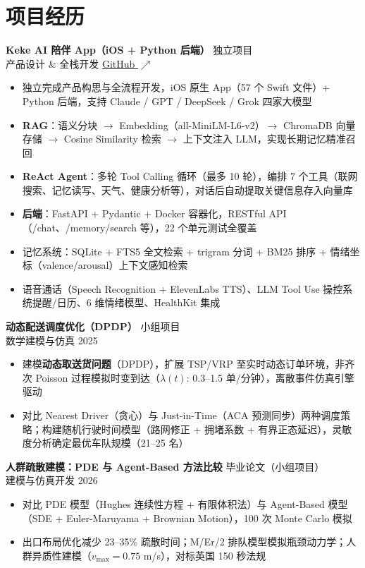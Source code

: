 \documentclass[a4paper,10pt]{article}
\newcommand{\projectentry}[4]{%
  \vspace{1pt}
  \noindent\textbf{#1} \hfill {\small\color{lightgray}#2}\\[-3pt]
  {\small\color{accent}#3} \hfill {\small #4}
  \vspace{0pt}
}
\begin{document}
\section*{项目经历}

\projectentry{Keke AI 陪伴 App（iOS + Python 后端）}{独立项目}{产品设计 \& 全栈开发}{\href{https://github.com/YueFangfly/Keke-AI-accompany-}{GitHub $\nearrow$}}

\begin{itemize}
  \item 独立完成产品构思与全流程开发，iOS 原生 App（57 个 Swift 文件）+ Python 后端，支持 Claude / GPT / DeepSeek / Grok 四家大模型
  \item \textbf{RAG}：语义分块 $\rightarrow$ Embedding（all-MiniLM-L6-v2）$\rightarrow$ ChromaDB 向量存储 $\rightarrow$ Cosine Similarity 检索 $\rightarrow$ 上下文注入 LLM，实现长期记忆精准召回
  \item \textbf{ReAct Agent}：多轮 Tool Calling 循环（最多 10 轮），编排 7 个工具（联网搜索、记忆读写、天气、健康分析等），对话后自动提取关键信息存入向量库
  \item \textbf{后端}：FastAPI + Pydantic + Docker 容器化，RESTful API（/chat、/memory/search 等），22 个单元测试全覆盖
  \item 记忆系统：SQLite + FTS5 全文检索 + trigram 分词 + BM25 排序 + 情绪坐标（valence/arousal）上下文感知检索
  \item 语音通话（Speech Recognition + ElevenLabs TTS）、LLM Tool Use 操控系统提醒/日历、6 维情绪模型、HealthKit 集成
\end{itemize}

\projectentry{动态配送调度优化（DPDP）}{小组项目}{数学建模与仿真}{2025}

\begin{itemize}
  \item 建模\textbf{动态取送货问题}（DPDP），扩展 TSP/VRP 至实时动态订单环境，非齐次 Poisson 过程模拟时变到达（$\lambda(t)$: 0.3--1.5 单/分钟），离散事件仿真引擎驱动
  \item 对比 Nearest Driver（贪心）与 Just-in-Time（ACA 预测同步）两种调度策略；构建随机行驶时间模型（路网修正 + 拥堵系数 + 有界正态延迟），灵敏度分析确定最优车队规模（21--25 名）
\end{itemize}

\projectentry{人群疏散建模：PDE 与 Agent-Based 方法比较}{毕业论文（小组项目）}{建模与仿真开发}{2026}

\begin{itemize}
  \item 对比 PDE 模型（Hughes 连续性方程 + 有限体积法）与 Agent-Based 模型（SDE + Euler-Maruyama + Brownian Motion），100 次 Monte Carlo 模拟
  \item 出口布局优化减少 23--35\% 疏散时间；M/Er/2 排队模型模拟瓶颈动力学；人群异质性建模（$v_{\max} = 0.75$ m/s），对标英国 150 秒法规
\end{itemize}
\end{document}
